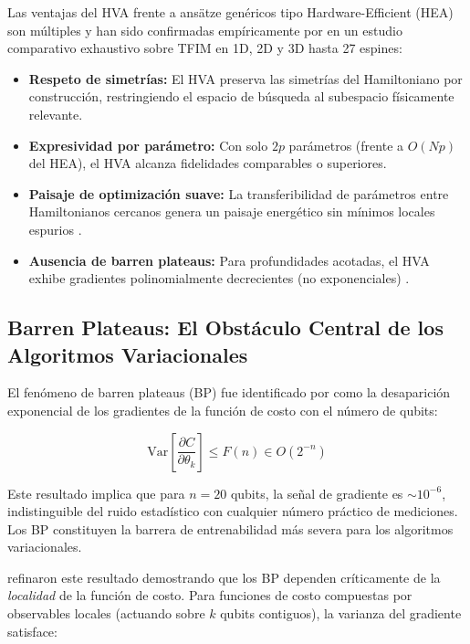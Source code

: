 \documentclass[11pt,a4paper,spanish]{book}
\begin{document}
Las ventajas del HVA frente a ansätze genéricos tipo Hardware-Efficient (HEA) son múltiples y han sido confirmadas empíricamente por \citet{tripathi2026} en un estudio comparativo exhaustivo sobre TFIM en 1D, 2D y 3D hasta 27 espines:

\begin{itemize}
    \item \textbf{Respeto de simetrías:} El HVA preserva las simetrías del Hamiltoniano por construcción, restringiendo el espacio de búsqueda al subespacio físicamente relevante.
    \item \textbf{Expresividad por parámetro:} Con solo $2p$ parámetros (frente a $O(Np)$ del HEA), el HVA alcanza fidelidades comparables o superiores.
    \item \textbf{Paisaje de optimización suave:} La transferibilidad de parámetros entre Hamiltonianos cercanos genera un paisaje energético sin mínimos locales espurios \citep{mele2022}.
    \item \textbf{Ausencia de barren plateaus:} Para profundidades acotadas, el HVA exhibe gradientes polinomialmente decrecientes (no exponenciales) \citep{wiersema2020}.
\end{itemize}

\subsection{Barren Plateaus: El Obstáculo Central de los Algoritmos Variacionales}

El fenómeno de barren plateaus (BP) fue identificado por \citet{mcclean2018} como la desaparición exponencial de los gradientes de la función de costo con el número de qubits:

\begin{equation}
\text{Var}\left[\frac{\partial C}{\partial \theta_k}\right] \leq F(n) \in O(2^{-n})
\label{eq:bp}
\end{equation}

Este resultado implica que para $n = 20$ qubits, la señal de gradiente es $\sim 10^{-6}$, indistinguible del ruido estadístico con cualquier número práctico de mediciones. Los BP constituyen la barrera de entrenabilidad más severa para los algoritmos variacionales.

\citet{cerezo2021} refinaron este resultado demostrando que los BP dependen críticamente de la \emph{localidad} de la función de costo. Para funciones de costo compuestas por observables locales (actuando sobre $k$ qubits contiguos), la varianza del gradiente satisface:
\end{document}
